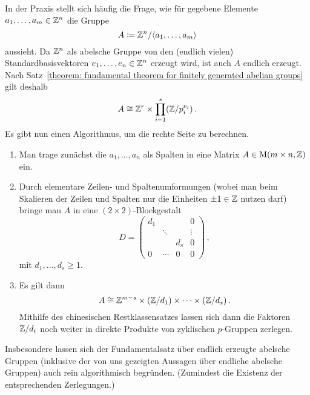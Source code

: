 \begin{remark}
  In der Praxis stellt sich häufig die Frage, wie für gegebene Elemente $a_1, \dotsc, a_m \in \mathbb{Z}^n$ die Gruppe
  \[
              A
    \coloneqq \mathbb{Z}^n / \langle a_1, \dotsc, a_m\rangle
  \]
  aussieht.
  Da $\mathbb{Z}^n$ als abelsche Gruppe von den (endlich vielen) Standardbasisvektoren $e_1, \dotsc, e_n \in \mathbb{Z}^n$ erzeugt wird, ist auch $A$ endlich erzeugt.
  Nach Satz~\ref{theorem: fundamental theorem for finitely generated abelian groups} gilt deshalb
  \[
          A
    \cong \mathbb{Z}^r \times \prod_{i=1}^s (\mathbb{Z}/p_i^{\nu_i}) \,.
  \]
  Es gibt nun einen Algorithmus, um die rechte Seite zu berechnen.
  \begin{enumerate}
    \item
      Man trage zunächst die $a_1, \dotsc, a_n$ als Spalten in eine Matrix $A \in \operatorname{M}(m \times n, \mathbb{Z})$ ein.
    \item
      Durch elementare Zeilen- und Spaltenumformungen (wobei man beim Skalieren der Zeilen und Spalten nur die Einheiten $\pm 1 \in \mathbb{Z}$ nutzen darf) bringe man $A$ in eine $(2 \times 2)$-Blockgestalt
      \[
          D
        = \left(
          \begin{array}{ccc|c}
            d_1 &         &         & 0       \\
                & \ddots  &         & \vdots  \\
                &         & d_s     & 0       \\
            \hline
            0   & \cdots  & 0       & 0
          \end{array}
          \right) \,,
      \]
      mit $d_1, \dotsc, d_s \geq 1$.
    \item
      Es gilt dann
      \[
              A
        \cong \mathbb{Z}^{m-s} \times (\mathbb{Z}/d_1) \times \dotsb \times (\mathbb{Z}/d_s) \,.
      \]
      Mithilfe des chinesischen Restklassensatzes lassen sich dann die Faktoren $\mathbb{Z}/d_i$ noch weiter in direkte Produkte von zyklischen $p$-Gruppen zerlegen.
  \end{enumerate}
  Insbesondere lassen sich der Fundamentalsatz über endlich erzeugte abelsche Gruppen (inklusive der von uns gezeigten Aussagen über endliche abelsche Gruppen) auch rein algorithmisch begründen.
  (Zumindest die Existenz der entsprechenden Zerlegungen.)
\end{remark}



